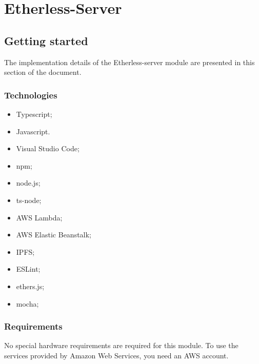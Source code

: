 \section{Etherless-Server}
	
	\subsection{Getting started}
		The implementation details of the Etherless-server module are presented in this section of the document.
	
		\subsubsection{Technologies} %
				\begin{itemize}
					\item Typescript; 
					\item Javascript.
				\end{itemize}
				\begin{itemize}
					\item Visual Studio Code;
					\item npm; 
					\item node.js;
					\item ts-node;
					\item AWS Lambda;
					\item AWS Elastic Beanstalk;
					\item IPFS;
					\item ESLint;
				\end{itemize}
				\begin{itemize}
					\item ethers.js;
					\item mocha;
				\end{itemize}
		
		\subsubsection{Requirements} %
				No special hardware requirements are required for this module.
				To use the services provided by Amazon Web Services, you need an AWS account.
		
